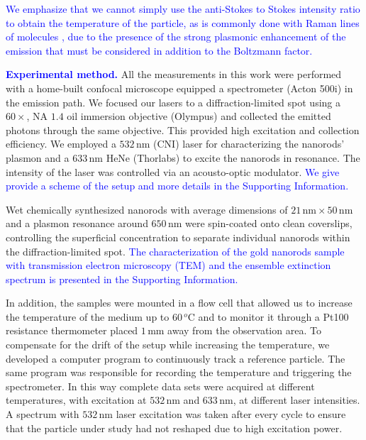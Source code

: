 \documentclass[journal=nalefd,manuscript=letter]{achemso}
\newcommand{\HI}[1]{\textcolor{blue}{#1}} %
\newcommand{\nm}{\ensuremath{\,\textrm{nm}}}
\newcommand{\mm}{\ensuremath{\,\textrm{mm}}}
\newcommand{\degree}{\ensuremath{\,^o\textrm{C}}}
\begin{document}
\HI{We emphasize that we cannot simply use the anti-Stokes to Stokes intensity ratio to 
obtain the temperature of the particle, as is commonly done with Raman lines of molecules 
\cite{krishnan1928influence,zondervan2006single}, due to the presence of the strong plasmonic enhancement
of the emission that must be considered in addition to the Boltzmann factor.}

\HI{\textbf{Experimental method.}} All the measurements in this work were performed with a home-built confocal
microscope equipped a spectrometer (Acton 500i) in the emission path.  We focused
our lasers to a diffraction-limited spot using a $60\times$, NA $1.4$ oil immersion
objective (Olympus) and collected the emitted photons through the same
objective. This provided high excitation and collection efficiency.
We employed a $532\nm$ (CNI) laser for characterizing the nanorods' plasmon and
a $633\nm$ HeNe (Thorlabs) to excite the nanorods in resonance.
The intensity of the laser was controlled via an acousto-optic modulator. 
\HI{We give provide a scheme of the setup and more details in the Supporting Information.}

Wet chemically synthesized nanorods\cite{Nikoobakht2003} with average dimensions
of $21\nm\times50\nm$ and a plasmon resonance around $650\nm$ were spin-coated
onto clean coverslips, controlling the superficial concentration to separate
individual nanorods within the diffraction-limited spot\cite{Zijlstra2011}.
\HI{The characterization of the gold nanorods sample with transmission electron microscopy (TEM)
and the ensemble extinction spectrum is presented in the Supporting Information.}

In addition, the samples were mounted in a flow cell that allowed us to increase
the temperature of the medium up to $60\degree$ and to monitor it through a
Pt100 resistance thermometer placed $1\mm$ away from the observation area. 
To compensate for the drift of the setup while increasing the temperature, we
developed a computer program to continuously track a reference particle. The
same program was responsible for recording the temperature and triggering the
spectrometer. In this way complete data sets were acquired at different
temperatures, with excitation at $532\nm$ and $633\nm$, at
different laser intensities. A spectrum with $532\nm$ laser excitation 
was taken after every cycle to ensure that the particle under study had 
not reshaped due to high excitation power.
\end{document}
